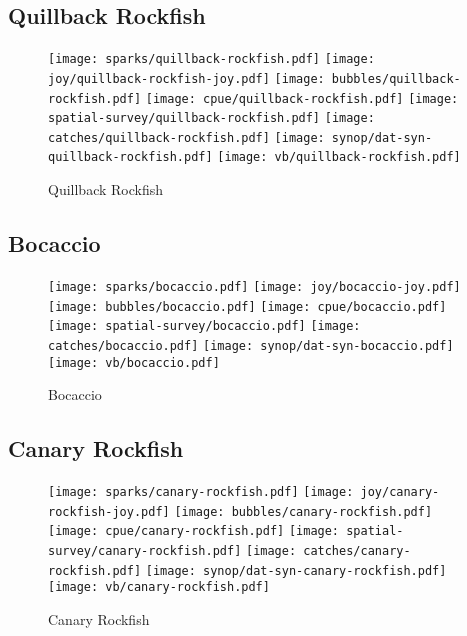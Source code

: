 \subsection*{Quillback Rockfish}

\begin{figure}[htbp]
\centering
\texttt{[image: sparks/quillback-rockfish.pdf]}
\texttt{[image: joy/quillback-rockfish-joy.pdf]}
\texttt{[image: bubbles/quillback-rockfish.pdf]}
\texttt{[image: cpue/quillback-rockfish.pdf]}
\texttt{[image: spatial-survey/quillback-rockfish.pdf]}
\texttt{[image: catches/quillback-rockfish.pdf]}
\texttt{[image: synop/dat-syn-quillback-rockfish.pdf]}
\texttt{[image: vb/quillback-rockfish.pdf]}
\caption{Quillback Rockfish}
\end{figure}
\clearpage
\subsection*{Bocaccio}

\begin{figure}[htbp]
\centering
\texttt{[image: sparks/bocaccio.pdf]}
\texttt{[image: joy/bocaccio-joy.pdf]}
\texttt{[image: bubbles/bocaccio.pdf]}
\texttt{[image: cpue/bocaccio.pdf]}
\texttt{[image: spatial-survey/bocaccio.pdf]}
\texttt{[image: catches/bocaccio.pdf]}
\texttt{[image: synop/dat-syn-bocaccio.pdf]}
\texttt{[image: vb/bocaccio.pdf]}
\caption{Bocaccio}
\end{figure}
\clearpage
\subsection*{Canary Rockfish}

\begin{figure}[htbp]
\centering
\texttt{[image: sparks/canary-rockfish.pdf]}
\texttt{[image: joy/canary-rockfish-joy.pdf]}
\texttt{[image: bubbles/canary-rockfish.pdf]}
\texttt{[image: cpue/canary-rockfish.pdf]}
\texttt{[image: spatial-survey/canary-rockfish.pdf]}
\texttt{[image: catches/canary-rockfish.pdf]}
\texttt{[image: synop/dat-syn-canary-rockfish.pdf]}
\texttt{[image: vb/canary-rockfish.pdf]}
\caption{Canary Rockfish}
\end{figure}
\clearpage
